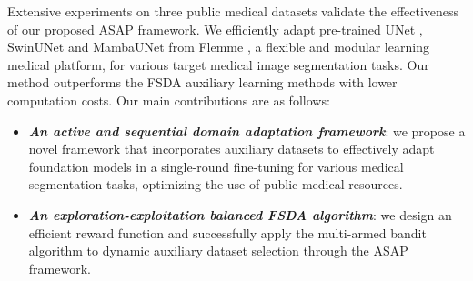 Extensive experiments on three public medical datasets validate the effectiveness of our proposed ASAP framework.
We efficiently adapt pre-trained 
UNet \cite{ronneberger2015u}, SwinUNet \cite{cao2022swin} and MambaUNet \cite{wang2024mamba} from Flemme
\cite{zhang2024flemme}, 
a flexible and modular learning medical platform, for various target medical image segmentation tasks.
Our method outperforms the FSDA auxiliary learning methods with lower computation costs.
Our main contributions are as follows:
\begin{itemize}
    \item \textbf{\textit{An active and sequential domain adaptation framework}}: we propose a novel framework that incorporates auxiliary datasets to effectively adapt foundation models in a single-round fine-tuning for various medical segmentation tasks, optimizing the use of public medical resources.
    \item \textbf{\textit{An exploration-exploitation balanced  FSDA algorithm}}: we design an efficient reward function and successfully apply the multi-armed bandit algorithm to dynamic auxiliary dataset selection through the ASAP framework.
\end{itemize}





